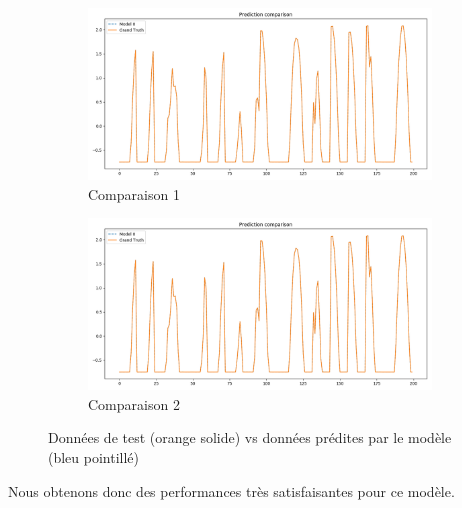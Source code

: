 \documentclass{article}
\begin{document}
    \begin{figure}
        \centering
        \begin{subfigure}{.5\textwidth}
          \centering
          \includegraphics[scale=0.25]{comparison_test_0.png}
          \caption{Comparaison 1}
          \label{fig:sub1}
        \end{subfigure}%
        \begin{subfigure}{.5\textwidth}
          \centering
          \includegraphics[scale=0.25]{comparison_test_0.png}
          \caption{Comparaison 2}
          \label{fig:sub2}
        \end{subfigure}
        \caption{Données de test (orange solide) vs données prédites par le modèle (bleu pointillé)}
        \label{fig:test}
    \end{figure}
    Nous obtenons donc des performances très satisfaisantes pour ce modèle.
\end{document}
